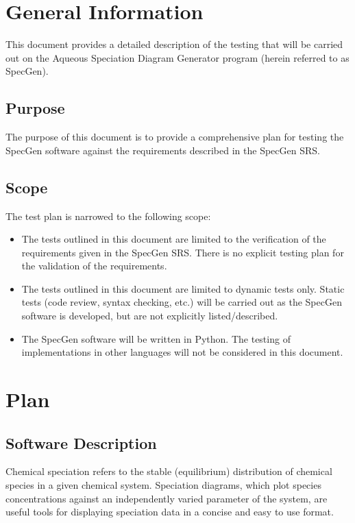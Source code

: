 \documentclass[12pt, titlepage]{article}
\newcommand{\progname}{SpecGen}
\begin{document}
\section{General Information}

This document provides a detailed description of the testing that will be 
carried out on the Aqueous Speciation Diagram Generator program (herein referred 
to as \progname{}).  

\subsection{Purpose}
The purpose of this document is to provide a comprehensive plan for testing the 
\progname{} software against the requirements described in the \progname{} SRS.

\subsection{Scope}
The test plan is narrowed to the following scope:
\begin{itemize}
\item The tests outlined in this document are limited to the verification of the 
  requirements given in the \progname{} SRS.  There is no explicit testing plan 
  for the validation of the requirements.
\item The tests outlined in this document are limited to dynamic tests only.  
  Static tests (code review, syntax checking, etc.) will be carried out as the 
  \progname{} software is developed, but are not explicitly listed/described.
\item The \progname{} software will be written in Python.  The testing of 
  implementations in other languages will not be considered in this document.
\end{itemize}

\section{Plan}
\label{SecPlan}
	
\subsection{Software Description}
Chemical speciation refers to the stable (equilibrium) distribution of chemical 
species in a given chemical system.   Speciation diagrams, which plot species 
concentrations against an independently varied parameter of the system, are 
useful tools for displaying speciation data in a concise and easy to use format.  
\end{document}
